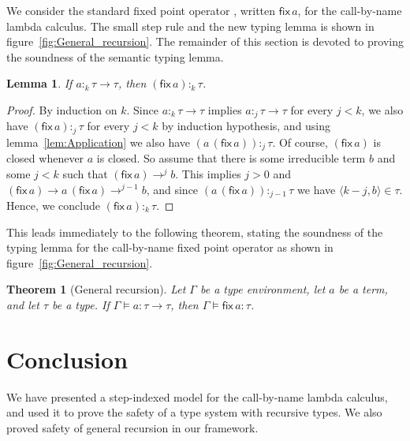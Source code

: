 \documentclass[10pt,a4paper,final,twocolumn]{article}
\theoremstyle{definition}
\theoremstyle{plain}
\newtheorem{lemma}[definition]{Lemma}
\newtheorem{theorem}[definition]{Theorem}
\newcommand{\app}[2]{\ensuremath{{#1}\,{#2}}}
\newcommand{\fix}[1]{\ensuremath{\mathsf{fix}\,{#1}}}
\newcommand{\pair}[1]{\ensuremath{\langle{#1}\rangle}}
\begin{document}
We consider the standard fixed point operator \cite{Pierce02}, written $\fix{a}$, for the
call-by-name lambda calculus. The small step rule and the new typing lemma is shown in
figure~\ref{fig:General_recursion}. The remainder of this section is devoted to proving the
soundness of the semantic typing lemma.

\begin{lemma}
  If $a :_k \tau \to \tau$, then $(\fix{a}) :_k \tau$.
\end{lemma}

\begin{proof}
  By induction on $k$. Since \mbox{$a :_k \tau \to \tau$} implies \mbox{$a :_j \tau \to \tau$} for every
  \mbox{$j < k$}, we also have \mbox{$(\fix{a}) :_j \tau$} for every \mbox{$j < k$} by induction hypothesis, and using
  lemma~\ref{lem:Application} we also have \mbox{$(\app{a}{(\fix{a})}) :_j \tau$}. Of course,
  \mbox{$(\fix{a})$} is closed whenever $a$ is closed. So assume that there is some irreducible term
  $b$ and some \mbox{$j < k$} such that \mbox{$(\fix{a}) \to^j b$}.
  This implies \mbox{$j > 0$} and \mbox{$(\fix{a}) \to \app{a}{(\fix{a})} \to^{j-1} b$}, and since
  \mbox{$(\app{a}{(\fix{a})}) :_{j-1} \tau$} we have \mbox{$\pair{k-j,b} \in \tau$}. Hence, we conclude
  \mbox{$(\fix{a}) :_k \tau$}.
\end{proof}

This leads immediately to the following theorem, stating the soundness of the typing lemma
for the call-by-name fixed point operator as shown in figure~\ref{fig:General_recursion}.

\begin{theorem}[General recursion]
  Let $\Gamma$ be a type environment, let $a$ be a term, and let $\tau$ be a type.
  If \mbox{$\Gamma \models a : \tau \to \tau$}, then \mbox{$\Gamma \models \fix{a} : \tau$}.
\end{theorem}


\section{Conclusion}
\label{sec:Conclusion}


We have presented a step-indexed model for the call-by-name lambda calculus, and used it to
prove the safety of a type system with recursive types. We also proved safety of general
recursion in our framework.




\end{document}
